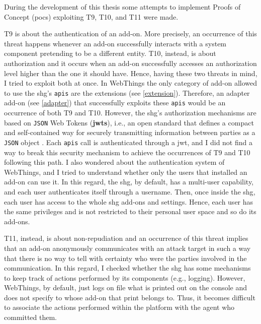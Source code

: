 During the development of this thesis some attempts to implement Proofs of Concept (\glspl{poc}) exploiting T9, T10, and T11 were made.

T9 is about the authentication of an add-on. More precisely, an occurrence of this threat happens whenever an add-on successfully interacts with a system component pretending to be a different entity. T10, instead, is about authorization and it occurs when an add-on successfully accesses an authorization level higher than the one it should have.
Hence, having these two threats in mind, 
I tried to exploit both at once. In WebThings the only category of add-on allowed to use the \gls{shg}'s \texttt{\glspl{api}} are the extensions (see \autoref{extension}). Therefore, an adapter add-on (see \autoref{adapter}) that successfully exploits these \texttt{\glspl{api}} would be an occurrence of both T9 and T10. However, the \gls{shg}'s authorization mechanisms are based on \texttt{JSON} Web Tokens (\textbf{\glspl{jwt}}), i.e., an open standard that defines a compact and self-contained way for securely transmitting information between parties as a \texttt{JSON} object \cite{rfc7519}. Each \texttt{\glspl{api}} call is authenticated through a \gls{jwt}, and I did not find a way to break this security mechanism to achieve the occurrences of T9 and T10 following this path. 
I also wondered about the authentication system of WebThings, and I tried to understand whether 
only the users that installed an add-on can use it. In this regard, the \gls{shg}, by default, has a multi-user capability, and each user authenticates itself through a username. Then, once inside the \gls{shg}, each user has access to the whole \gls{shg} add-ons and settings. Hence, each user has the same privileges and is not restricted to their personal user space and so do its add-ons.

T11, instead, is about non-repudiation and an occurrence of this threat implies that an add-on anonymously communicates with an attack target in such a way that there is no way to tell with certainty who were the parties involved in the communication. In this regard, I checked whether the \gls{shg} has some mechanisms to keep track of actions performed by its components (e.g., logging). However, WebThings, by default, just logs on file what is printed out on the console and does not specify to whose add-on that print belongs to. Thus, it becomes difficult to associate the actions performed within the platform with the agent who committed them.


